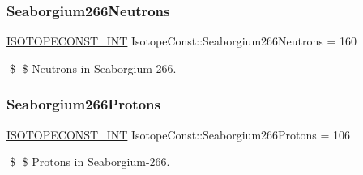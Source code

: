 \subsubsection{\texorpdfstring{Seaborgium266\+Neutrons}{Seaborgium266Neutrons}}
{\footnotesize\ttfamily \mbox{\hyperlink{group___isotope_const-_macros_ga5f18360b3e99483a35c32d789e62621c}{I\+S\+O\+T\+O\+P\+E\+C\+O\+N\+S\+T\+\_\+\+I\+NT}} Isotope\+Const\+::\+Seaborgium266\+Neutrons = 160}

\$ \$ Neutrons in Seaborgium-\/266. \mbox{\label{group___isotope_const-_seaborgium-_sg266_ga7fbf415fb09c5cd55a3f0a540a2545fb}} 
\subsubsection{\texorpdfstring{Seaborgium266\+Protons}{Seaborgium266Protons}}
{\footnotesize\ttfamily \mbox{\hyperlink{group___isotope_const-_macros_ga5f18360b3e99483a35c32d789e62621c}{I\+S\+O\+T\+O\+P\+E\+C\+O\+N\+S\+T\+\_\+\+I\+NT}} Isotope\+Const\+::\+Seaborgium266\+Protons = 106}

\$ \$ Protons in Seaborgium-\/266. 